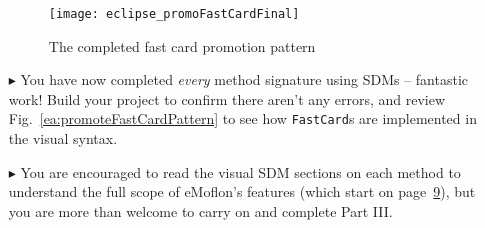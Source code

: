 \begin{itemize}
\begin{figure}[htp]
\begin{center}
  \texttt{[image: eclipse\_promoFastCardFinal]}
  \caption{The completed fast card promotion pattern}
  \label{eclipse:promoFastCardFinal}
\end{center}
\end{figure}

\vspace{0.5cm}

\item[$\blacktriangleright$] You have now completed \emph{every} method signature using SDMs -- fantastic work! Build your project to
confirm there aren't any errors, and review Fig.~\ref{ea:promoteFastCardPattern} to see how \texttt{FastCard}s are implemented in the visual syntax.

\item[$\blacktriangleright$] You are encouraged to read the visual SDM sections on each method to understand the full scope of eMoflon's features (which start
on page~\hyperlink{Page.9}{9}), but you are more than welcome to carry on and complete Part III.
  
\end{itemize}
